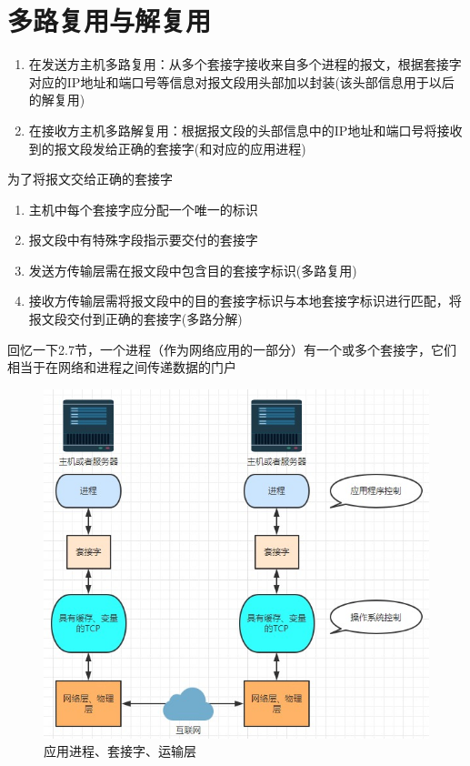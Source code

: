 \documentclass[]{report}
\begin{document}
	\section{多路复用与解复用}
		\begin{enumerate}
			\item 在发送方主机多路复用：从多个套接字接收来自多个进程的报文，根据套接字对应的IP地址和端口号等信息对报文段用头部加以封装(该头部信息用于以后的解复用)
			\item 在接收方主机多路解复用：根据报文段的头部信息中的IP地址和端口号将接收到的报文段发给正确的套接字(和对应的应用进程)
		\end{enumerate}
		为了将报文交给正确的套接字
		\begin{enumerate}
			\item 主机中每个套接字应分配一个唯一的标识
			\item 报文段中有特殊字段指示要交付的套接字
			\item 发送方传输层需在报文段中包含目的套接字标识(多路复用)
			\item 接收方传输层需将报文段中的目的套接字标识与本地套接字标识进行匹配，将报文段交付到正确的套接字(多路分解)
		\end{enumerate}
		回忆一下2.7节，一个进程（作为网络应用的一部分）有一个或多个套接字，它们相当于在网络和进程之间传递数据的门户
		\begin{figure}[h!]
			\centering
			\begin{minipage}{40em}
				\centering
				\includegraphics[scale = 0.4]{images/Progress_Socket_and_TCP.jpg}
				\caption{应用进程、套接字、运输层}
			\end{minipage}
		\end{figure}
\end{document}
